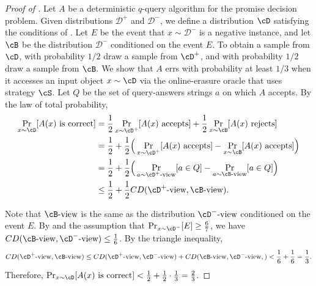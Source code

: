 \documentclass{toc}
\begin{document}
	\begin{proof}[Proof of ]
	Let $A$ be a deterministic $q$-query algorithm for the promise decision problem. Given distributions $\mathcal{D}^+$ and $\mathcal{D}^-$, we define a distribution $\cD$ satisfying the conditions of . Let $E$ be the event that  $x \sim \mathcal{D}^-$ is a negative instance, and let $\cB$ be the distribution $\mathcal{D}^-$ conditioned on the event $E$. To obtain a sample from $\cD$, with probability $1/2$ draw a sample from $\cD^+$, and with probability $1/2$ draw a sample from $\cB$. We show that $A$ errs with probability at least $1/3$ when it accesses an input object $x\sim \cD$ via the online-erasure oracle that uses strategy $\cS$. 	Let $Q$ be the set of query-answers strings $a$ on which $A$ accepts.  By the law of total probability, 
	\begin{align*}
	    \Pr_{x\sim \cD}[A(x) \textnormal{ is correct}] &= \frac{1}{2} \Pr_{x\sim \cD^+}[A(x) \textnormal{ accepts}] + \frac{1}{2} \Pr_{x\sim \cB}[A(x) \textnormal{ rejects}] \\
	    &= \frac{1}{2} + \frac{1}{2}\Big( \Pr_{x\sim \cD^+}[A(x) \textnormal{ accepts}] -  \Pr_{x\sim \cB}[A(x) \textnormal{ accepts}]   \Big) \\
	    &= \frac{1}{2} + \frac{1}{2}\Big( \Pr_{a\sim \cD^+\text{-view}}[a \in Q] -  \Pr_{a\sim \cB\text{-view}}[a \in Q]  \Big) \\
	    &\leq \frac{1}{2} + \frac{1}{2}CD(\cD^+\text{-view}, \cB\text{-view}). 
	\end{align*}
	
	Note that $\cB\text{-view}$ is the same as the distribution $\cD^-\text{-view}$ conditioned on the event $E$. By  and the assumption that $\Pr_{x\sim \cD^-}[E] \geq \frac{6}{7}$, we have $CD(\cB\text{-view}, \cD^-\text{-view}) \leq \frac{1}{6}$. By the triangle inequality, 
	\begin{equation*}
	    CD(\cD^+\text{-view}, \cB\text{-view}) \leq  
	    CD(\cD^+\text{-view}, \cD^-\text{-view}) +  
	    CD(\cB\text{-view}, \cD^-\text{-view},) < \frac{1}{6} + \frac{1}{6} = \frac{1}{3}.
	\end{equation*}
	Therefore, $\Pr_{x\sim \cD}[A(x) \textnormal{ is correct}] < \frac{1}{2} + \frac{1}{2} \cdot \frac{1}{3} = \frac{2}{3}$. 
	\end{proof}
	






\end{document}
